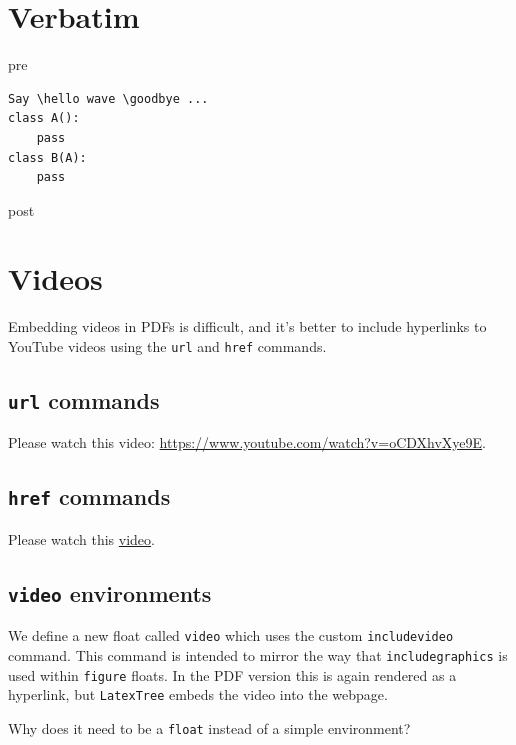\documentclass[12pt]{article}
\theoremstyle{plain}
\theoremstyle{definition}
\theoremstyle{remark}
\theoremstyle{mystyle}
\begin{document}
\section{Verbatim}
pre
\begin{verbatim}
Say \hello wave \goodbye ...
class A():
	pass
class B(A):
	pass
\end{verbatim}
post

%
%

\section{Videos}
Embedding videos in PDFs is difficult, and it's better to include hyperlinks to YouTube videos using the \texttt{url} and \texttt{href} commands. 


\subsection*{\texttt{url} commands}
Please watch this video: \url{https://www.youtube.com/watch?v=oCDXhvXye9E}.

\subsection*{\texttt{href} commands}
Please watch this \href{https://www.youtube.com/watch?v=oCDXhvXye9E}{video}.

\subsection{\texttt{video} environments}
We define a new float called {\tt video} which uses the custom {\tt includevideo} command. This command is intended to mirror the way that {\tt includegraphics} is used within {\tt figure} floats. In the PDF version this is again rendered as a hyperlink, but {\tt LatexTree} embeds the video into the webpage.

Why does it need to be a {\tt float} instead of a simple environment?
\end{document}
